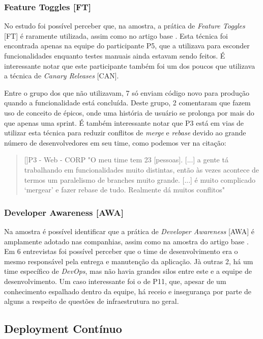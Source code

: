 \subsubsection{Feature Toggles [FT]}

No estudo foi possível perceber que, na amostra, a prática de \emph{Feature Toggles} [FT] é raramente utilizada, assim como no artigo base \cite{empiricalStudy2016}. Esta técnica foi encontrada apenas na equipe do participante P5, que a utilizava para esconder funcionalidades enquanto testes manuais ainda estavam sendo feitos. É interessante notar que este participante também foi um dos poucos que utilizava a técnica de \emph{Canary Releases} [CAN].

Entre o grupo dos que não utilizavam, 7 só enviam código novo para produção quando a funcionalidade está concluída. Deste grupo, 2 comentaram que fazem uso de conceito de épicos, onde uma história de usuário se prolonga por mais do que apenas uma sprint. É também interessante notar que P3 está em vias de utilizar esta técnica para reduzir conflitos de \emph{merge} e \emph{rebase} devido ao grande número de desenvolvedores em seu time, como podemos ver na citação:

\begin{quotation}[]{P3 - Web - CORP}
    "O meu time tem 23 [pessoas]. [...] a gente tá trabalhando em funcionalidades muito distintas, então às vezes acontece de termos um paralelismo de branches muito grande. [...] é muito complicado ‘mergear’ e fazer rebase de tudo. Realmente dá muitos conflitos"
\end{quotation}


\subsubsection{Developer Awareness [AWA]}

Na amostra é possível identificar que a prática de \emph{Developer Awareness} [AWA] é amplamente adotado nas companhias, assim como na amostra do artigo base \cite{empiricalStudy2016}. Em 6 entrevistas foi possível perceber que o time de desenvolvimento era o mesmo responsável pela entrega e manutenção da aplicação. Jà outras 2, há um time específico de \emph{DevOps}, mas não havia grandes silos entre este e a equipe de desenvolvimento. Um caso interessante foi o de P11, que, apesar de um conhecimento espalhado dentro da equipe, há receio e insegurança por parte de alguns a respeito de questões de infraestrutura no geral.


\subsection{Deployment Contínuo}

